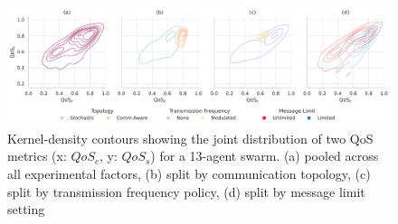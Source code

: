 \documentclass[conference]{IEEEtran}
\begin{document}
\begin{figure}[h]
    \centering
    \includegraphics[width=1\textwidth]{qos_impact.pdf}
    \caption{Kernel-density contours showing the joint distribution of two QoS metrics (x: $QoS_c$, y: $QoS_s$) for a 13-agent swarm. (a) pooled across all experimental factors, (b) split by communication topology, (c) split by transmission frequency policy, (d) split by message limit setting}
    \label{fig:qos}
\end{figure}
\end{document}
